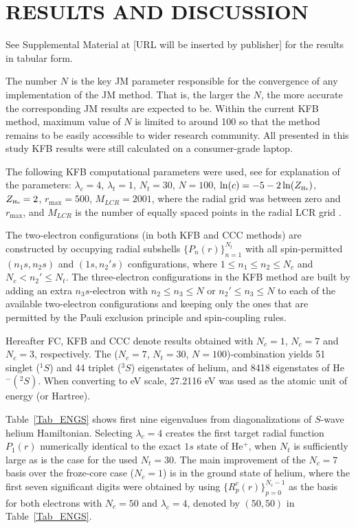 \documentclass[aip
, pra
, showpacs
, aps
, twocolumn
, groupedaddress
, floatfix
]{revtex4}
\begin{document}
\section{RESULTS AND DISCUSSION}

See Supplemental Material at [URL will be inserted by publisher] for the results in tabular form.

The number $N$ is the key JM parameter responsible for the convergence of any implementation of the JM method.
That is, the larger the $N$, the more accurate the corresponding JM results are expected to be.
Within the current KFB method, maximum value of $N$ is limited to around 100 so that the method remains to be easily accessible
to wider research community. All presented in this study KFB results were still calculated on a consumer-grade laptop.


The following KFB computational parameters were used, see \cite{KB10p022708} for explanation of the parameters:
$\lambda_c=4$, $\lambda_t=1$, $N_t=30$, $N=100$, $\ln(c)=-5 - 2\ln(Z_{\mbox{\tiny{He}}} )$, $Z_{\mbox{\tiny{He}}}=2$, $r_{\max}=500$,
$M_{LCR}=2001$, where the radial grid was between zero and $r_{\max}$, and
$M_{LCR}$ is the number of equally spaced points in the radial LCR grid \cite{KB10p022708}.

The two-electron configurations (in both KFB and CCC methods) are constructed by occupying  radial subshells $\{P_n(r)\}_{n=1}^{N_t}$ 
with all spin-permitted $(n_1s,n_2s)$ and $(1s,n_2's)$ configurations,
where $1 \leq n_1 \leq n_2 \leq N_c$ and $N_c<n_2' \leq N_t$.
The three-electron configurations in the KFB method are built by adding an extra $n_3s$-electron with 
$ n_2 \leq n_3 \leq N$ or $ n_2' \leq n_3 \leq N$ to each of the available two-electron configurations and keeping only the ones that are permitted by the Pauli exclusion principle and spin-coupling rules.


Hereafter FC, KFB and CCC denote results obtained with $N_c=1$, $N_c=7$ and $N_c=3$, respectively.
The ($N_c=7$, $N_t=30$, $N=100$)-combination yields 51 singlet ($^1S$) and 44 triplet ($^3S$) eigenstates of helium, and 8418 eigenstates of He$^-(^2S)$.
When converting to eV scale, 27.2116 eV was used as the atomic unit of energy (or Hartree).

Table~\ref{Tab_ENGS} shows first nine eigenvalues from diagonalizations of $S$-wave helium Hamiltonian.
Selecting $\lambda_c=4$ creates the first target radial function $P_1(r)$ numerically identical to the exact $1s$ state of He$^+$,
when $N_t$ is sufficiently large as is the case for the used $N_t=30$.
The main improvement of the $N_c=7$ basis over the froze-core case ($N_c=1$) is in the ground state of helium, where
the first seven significant digits \cite{G94} were obtained by using  $\{R^{c}_p(r)\}_{p=0}^{N_c-1}$ as the basis for both electrons with $N_c=50$ and $\lambda_c=4$, denoted by $(50,50)$ in Table~\ref{Tab_ENGS}.
\end{document}

